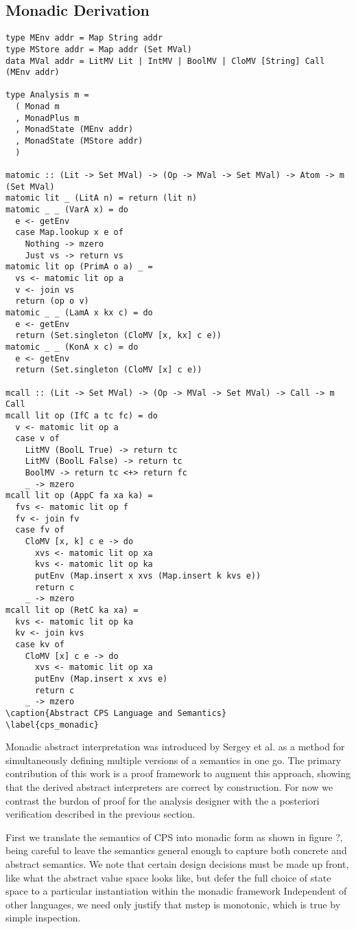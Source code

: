\documentclass{article}
\begin{document}
\subsection{Monadic Derivation}

\begin{lstlisting}[basicstyle=\tiny]
type MEnv addr = Map String addr
type MStore addr = Map addr (Set MVal)
data MVal addr = LitMV Lit | IntMV | BoolMV | CloMV [String] Call (MEnv addr)

type Analysis m =
  ( Monad m
  , MonadPlus m
  , MonadState (MEnv addr)
  , MonadState (MStore addr)
  )

matomic :: (Lit -> Set MVal) -> (Op -> MVal -> Set MVal) -> Atom -> m (Set MVal)
matomic lit _ (LitA n) = return (lit n)
matomic _ _ (VarA x) = do
  e <- getEnv
  case Map.lookup x e of
    Nothing -> mzero
    Just vs -> return vs
matomic lit op (PrimA o a) _ = 
  vs <- matomic lit op a
  v <- join vs
  return (op o v)
matomic _ _ (LamA x kx c) = do
  e <- getEnv
  return (Set.singleton (CloMV [x, kx] c e))
matomic _ _ (KonA x c) = do
  e <- getEnv
  return (Set.singleton (CloMV [x] c e))

mcall :: (Lit -> Set MVal) -> (Op -> MVal -> Set MVal) -> Call -> m Call
mcall lit op (IfC a tc fc) = do
  v <- matomic lit op a
  case v of
    LitMV (BoolL True) -> return tc
    LitMV (BoolL False) -> return tc
    BoolMV -> return tc <+> return fc
    _ -> mzero
mcall lit op (AppC fa xa ka) =
  fvs <- matomic lit op f
  fv <- join fv
  case fv of
    CloMV [x, k] c e -> do
      xvs <- matomic lit op xa
      kvs <- matomic lit op ka
      putEnv (Map.insert x xvs (Map.insert k kvs e))
      return c
    _ -> mzero
mcall lit op (RetC ka xa) =
  kvs <- matomic lit op ka
  kv <- join kvs
  case kv of
    CloMV [x] c e -> do
      xvs <- matomic lit op xa
      putEnv (Map.insert x xvs e)
      return c
    _ -> mzero
\caption{Abstract CPS Language and Semantics}
\label{cps_monadic}
\end{lstlisting}

Monadic abstract interpretation was introduced by Sergey et al. as a method for
simultaneously defining multiple versions of a semantics in one go.
%
The primary contribution of this work is a proof framework to augment this
approach, showing that the derived abstract interpreters are correct by
construction.
%
For now we contrast the burdon of proof for the analysis designer with the a
posteriori verification described in the previous section.

First we translate the semantics of CPS into monadic form as shown in figure
?, being careful to leave the semantics general enough to capture both concrete
and abstract semantics.
%
We note that certain design decisions must be made up front, like what the
abstract value space looks like, but defer the full choice of state space to a
particular instantiation within the monadic framework
%
Independent of other languages, we need only justify that mstep is monotonic,
which is true by simple inspection.
\end{document}
